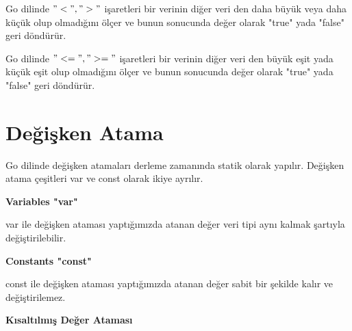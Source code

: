 \vspace{10mm}
Go dilinde $"<", ">"$ işaretleri bir verinin diğer veri den daha büyük veya daha küçük olup olmadığını ölçer ve bunun sonucunda değer olarak "true" yada "false" geri döndürür.

\vspace{10mm}
Go dilinde $"<=", ">="$  işaretleri bir verinin diğer veri den büyük eşit yada küçük eşit olup olmadığını ölçer ve bunun sonucunda değer olarak "true" yada "false" geri döndürür.
\vspace{10mm}





\section{Değişken Atama}

\vspace{10mm}

Go dilinde değişken atamaları derleme zamanında statik olarak yapılır. Değişken atama çeşitleri var ve const olarak ikiye ayrılır. 

\vspace{20mm}


\textbf{Variables "var"}
\vspace{10mm}

var ile değişken ataması yaptığımızda atanan değer veri tipi aynı kalmak şartıyla değiştirilebilir.
\vspace{10mm}




\vspace{20mm}
\textbf{Constants "const"}
\vspace{10mm}

const ile değişken ataması yaptığımızda atanan değer sabit bir şekilde kalır ve değiştirilemez.  
\vspace{5mm}

\vspace{10mm}

\vspace{10mm}
\textbf{Kısaltılmış Değer Ataması}
\vspace{7mm}

